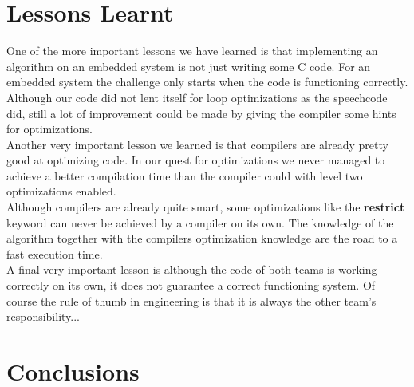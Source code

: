 \documentclass[a4paper]{article}
\begin{document}
\section{Lessons Learnt}
One of the more important lessons we have learned is that implementing an algorithm on an embedded system is not just writing some C code. For an embedded system the challenge only starts when the code is functioning correctly. Although our code did not lent itself for loop optimizations as the speechcode did, still a lot of improvement could be made by giving the compiler some hints for optimizations.\\

Another very important lesson we learned is that compilers are already pretty good at optimizing code. In our quest for optimizations we never managed to achieve a better compilation time than the compiler could with level two optimizations enabled. \\

Although compilers are already quite smart, some optimizations like the \textbf{restrict} keyword can never be achieved by a compiler on its own. The knowledge of the algorithm together with the compilers optimization knowledge are the road to a fast execution time.\\

A final very important lesson is although the code of both teams is working correctly on its own, it does not guarantee a correct functioning system. Of course the rule of thumb in engineering is that it is always the other team's responsibility...

\section{Conclusions}
\end{document}
